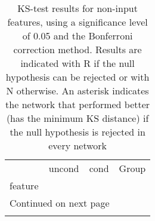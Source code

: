 	\begin{longtable}{llll}
		\caption[Test results for non input features]{ \small KS-test results for non-input features, using a significance level of 0.05 and the Bonferroni correction method. Results are indicated with R if the null hypothesis can be rejected or with N otherwise. An asterisk indicates the network that performed better (has the minimum KS distance) if the null hypothesis is rejected in every network}\\
		\toprule
		{} & uncond & cond & Group \\
		feature                       &        &      &       \\
		\midrule
		\endhead
		\midrule
		\multicolumn{3}{r}{{Continued on next page}} \\
		\midrule
		\endfoot
		

\end{longtable}
